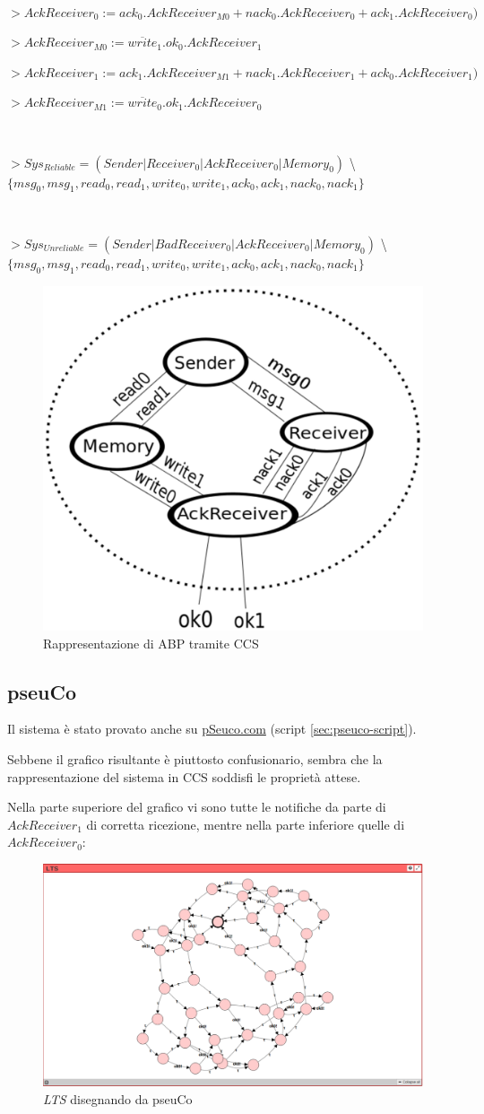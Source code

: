 $ $

$ > AckReceiver_0 := ack_0.AckReceiver_{M0} +
                     nack_0.AckReceiver_0 + ack_1.AckReceiver_0) $

$ > AckReceiver_{M0} := \overline{write}_1.ok_0.AckReceiver_1 $

$ > AckReceiver_1 := ack_1.AckReceiver_{M1} +
                     nack_1.AckReceiver_1 + ack_0.AckReceiver_1) $

$ > AckReceiver_{M1} := \overline{write}_0.ok_1.AckReceiver_0 $

$ $

$ > Sys_{Reliable} =  (Sender | Receiver_0 | AckReceiver_0 | Memory_0) $
  \textbackslash{} $ \{msg_0,msg_1,read_0,read_1,write_0,write_1,
                       ack_0,ack_1,nack_0,nack_1\} $

$ $

$ > Sys_{Unreliable} =  (Sender | BadReceiver_0 | AckReceiver_0 | Memory_0) $
  \textbackslash{} $ \{msg_0,msg_1,read_0,read_1,write_0,write_1,
                       ack_0,ack_1,nack_0,nack_1\} $

\begin{figure}[H]
  \centering
  \includegraphics[width=.5\columnwidth]{images/ccs.eps}
  \caption{Rappresentazione di ABP tramite CCS}
  \label{fig:ccs-abp}
\end{figure}

\subsection{pseuCo}

Il sistema è stato provato anche su \url{pSeuco.com} (script
\ref{sec:pseuco-script}). 

Sebbene il grafico risultante è piuttosto confusionario, sembra che la
rappresentazione del sistema in CCS soddisfi le proprietà attese.

Nella parte superiore del grafico vi sono tutte le notifiche da parte di
\texttt{$AckReceiver_1$} di corretta ricezione, mentre nella parte inferiore
quelle di \texttt{$AckReceiver_0$}:

\begin{figure}[H]
  \centering
  \includegraphics[width=.8\columnwidth]{images/pseuco.eps}
  \caption{\emph{LTS} disegnando da pseuCo}
  \label{fig:ccs-abp}
\end{figure}
